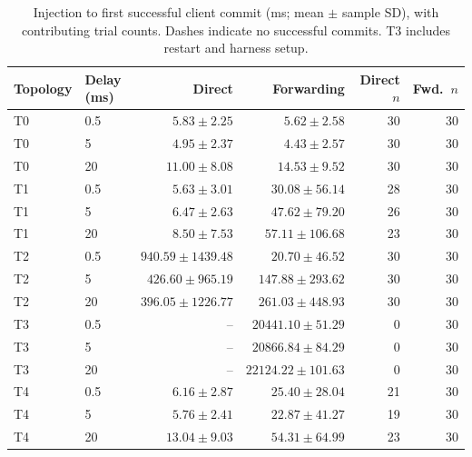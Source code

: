 \begin{table}[H]
  \centering
  \caption{Injection to first successful client commit (ms; mean $\pm$ sample SD), with contributing trial counts. Dashes indicate no successful commits. T3 includes restart and harness setup.}
  \label{tab:recovery}
  \begin{tabular}{llrrrr}
    \toprule
    Topology & Delay (ms) & Direct & Forwarding & Direct $n$ & Fwd.\ $n$ \\
    \midrule
    T0 & 0.5 & \(5.83 \pm 2.25\) & \(5.62 \pm 2.58\) & 30 & 30 \\
    T0 & 5 & \(4.95 \pm 2.37\) & \(4.43 \pm 2.57\) & 30 & 30 \\
    T0 & 20 & \(11.00 \pm 8.08\) & \(14.53 \pm 9.52\) & 30 & 30 \\
    T1 & 0.5 & \(5.63 \pm 3.01\) & \(30.08 \pm 56.14\) & 28 & 30 \\
    T1 & 5 & \(6.47 \pm 2.63\) & \(47.62 \pm 79.20\) & 26 & 30 \\
    T1 & 20 & \(8.50 \pm 7.53\) & \(57.11 \pm 106.68\) & 23 & 30 \\
    T2 & 0.5 & \(940.59 \pm 1439.48\) & \(20.70 \pm 46.52\) & 30 & 30 \\
    T2 & 5 & \(426.60 \pm 965.19\) & \(147.88 \pm 293.62\) & 30 & 30 \\
    T2 & 20 & \(396.05 \pm 1226.77\) & \(261.03 \pm 448.93\) & 30 & 30 \\
    T3 & 0.5 & -- & \(20441.10 \pm 51.29\) & 0 & 30 \\
    T3 & 5 & -- & \(20866.84 \pm 84.29\) & 0 & 30 \\
    T3 & 20 & -- & \(22124.22 \pm 101.63\) & 0 & 30 \\
    T4 & 0.5 & \(6.16 \pm 2.87\) & \(25.40 \pm 28.04\) & 21 & 30 \\
    T4 & 5 & \(5.76 \pm 2.41\) & \(22.87 \pm 41.27\) & 19 & 30 \\
    T4 & 20 & \(13.04 \pm 9.03\) & \(54.31 \pm 64.99\) & 23 & 30 \\
    \bottomrule
  \end{tabular}
\end{table}

